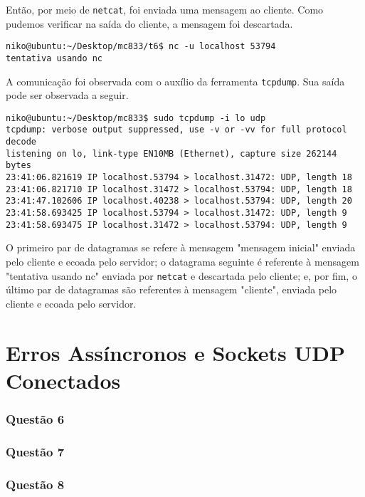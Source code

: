 \documentclass[a4paper,10pt]{article}
\begin{document}
Então, por meio de {\tt netcat}, foi enviada uma mensagem ao cliente. Como pudemos verificar na saída do cliente, a mensagem foi descartada.

\begin{lstlisting}
niko@ubuntu:~/Desktop/mc833/t6$ nc -u localhost 53794
tentativa usando nc

\end{lstlisting}

A comunicação foi observada com o auxílio da ferramenta {\tt tcpdump}. Sua saída pode ser observada a seguir.

\begin{lstlisting}
niko@ubuntu:~/Desktop/mc833$ sudo tcpdump -i lo udp
tcpdump: verbose output suppressed, use -v or -vv for full protocol decode
listening on lo, link-type EN10MB (Ethernet), capture size 262144 bytes
23:41:06.821619 IP localhost.53794 > localhost.31472: UDP, length 18
23:41:06.821710 IP localhost.31472 > localhost.53794: UDP, length 18
23:41:47.102606 IP localhost.40238 > localhost.53794: UDP, length 20
23:41:58.693425 IP localhost.53794 > localhost.31472: UDP, length 9
23:41:58.693475 IP localhost.31472 > localhost.53794: UDP, length 9

\end{lstlisting}

O primeiro par de datagramas se refere à mensagem "mensagem inicial" enviada pelo cliente e ecoada pelo servidor; o datagrama seguinte é referente à mensagem "tentativa usando nc" enviada por {\tt netcat} e descartada pelo cliente; e, por fim, o último par de datagramas são referentes à mensagem "cliente", enviada pelo cliente e ecoada pelo servidor.

\part{Erros Assíncronos e Sockets UDP Conectados}
\section{Questão 6}

\section{Questão 7}

\section{Questão 8}
\end{document}
